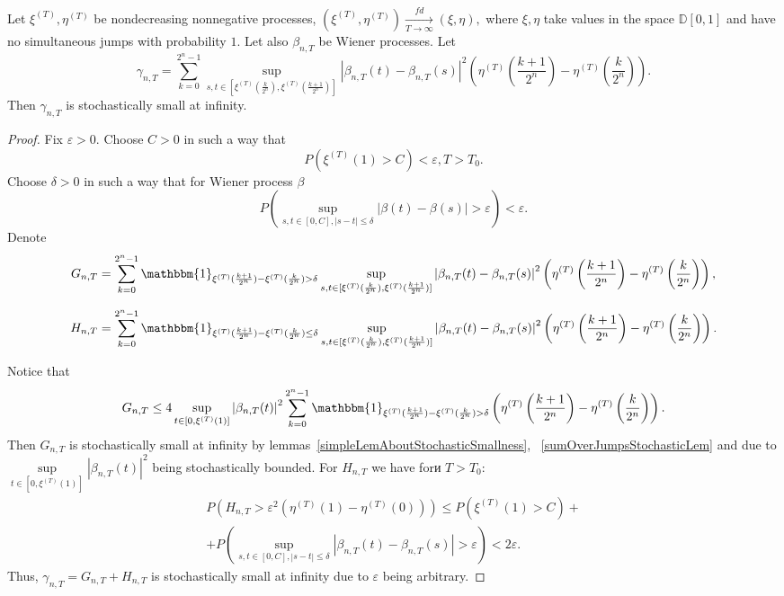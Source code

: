 \documentclass[12pt, a4paper, titlepage]{article}
\begin{document}
 
 \begin{lem}\label{mostSubtleGammaNTLem}
  Let $\xi^{(T)}, \eta^{(T)}$ be nondecreasing nonnegative processes,
  $(\xi^{(T)}, \eta^{(T)})\xrightarrow[T\to\infty]{fd} (\xi, \eta),$
  where $\xi, \eta$ take values in the space $\mathbb{D}[0,1]$
  and have no simultaneous jumps with probability $1$. 
  Let also $\beta_{n, T}$ be Wiener processes. Let
  $$\gamma_{n,T}=\sum\limits_{k=0}^{2^n-1}
  \sup\limits_{s,t \in [\xi^{(T)}(\frac{k}{2^n}), \xi^{(T)}(\frac{k+1}{2^n})]}
  \left|\beta_{n,T}(t)-\beta_{n,T}(s)\right|^2
  \left(\eta^{(T)}\left(\frac{k+1}{2^n}\right)-\eta^{(T)}\left(\frac{k}{2^n}\right)\right).$$
  Then $\gamma_{n,T}$ is stochastically small at infinity.  
 \end{lem}
 \begin{proof}
 Fix $\varepsilon>0$. 
 Choose $C>0$ in such a way that
 $$P\left(\xi^{(T)}(1)>C\right)<\varepsilon, T>T_0.$$
 Choose $\delta>0$ in such a way that for Wiener process $\beta$
 $$P\left(\sup\limits_{s, t \in [0, C], |s-t| \le \delta}|\beta(t)-\beta(s)|>\varepsilon\right) <\varepsilon.$$ 
 Denote
 $$G_{n, T} = \sum\limits_{k=0}^{2^n-1} \mathbbm{1}_{\xi^{(T)}(\frac{k+1}{2^n})-\xi^{(T)}(\frac{k}{2^n})>\delta}
  \sup\limits_{s,t \in [\xi^{(T)}(\frac{k}{2^n}), \xi^{(T)}(\frac{k+1}{2^n})]}  
  \left|\beta_{n,T}(t)-\beta_{n,T}(s)\right|^2
  \left(\eta^{(T)}\left(\frac{k+1}{2^n}\right)-\eta^{(T)}\left(\frac{k}{2^n}\right)\right),$$
 
 $$H_{n, T} = \sum\limits_{k=0}^{2^n-1}
  \mathbbm{1}_{\xi^{(T)}(\frac{k+1}{2^n})-\xi^{(T)}(\frac{k}{2^n}) \le \delta}
  \sup\limits_{s,t \in [\xi^{(T)}(\frac{k}{2^n}), \xi^{(T)}(\frac{k+1}{2^n})]}  
  \left|\beta_{n,T}(t)-\beta_{n,T}(s)\right|^2
  \left(\eta^{(T)}\left(\frac{k+1}{2^n}\right)-\eta^{(T)}\left(\frac{k}{2^n}\right)\right).$$
  
  Notice that 
  $$ G_{n,T} \le 
   4 \sup\limits_{t \in [0, \xi^{(T)}(1)]}
  \left|\beta_{n,T}(t)\right|^2
  \sum\limits_{k=0}^{2^n-1} \mathbbm{1}_{\xi^{(T)}(\frac{k+1}{2^n})-\xi^{(T)}(\frac{k}{2^n})>\delta}
  \left(\eta^{(T)}\left(\frac{k+1}{2^n}\right)-\eta^{(T)}\left(\frac{k}{2^n}\right)\right).
 $$  
 Then $G_{n, T}$ is stochastically small at infinity
 by lemmas~\ref{simpleLemAboutStochasticSmallness},
 ~\ref{sumOverJumpsStochasticLem} and due to
 $\sup\limits_{t \in [0, \xi^{(T)}(1)]}\left|\beta_{n,T}(t)\right|^2$
 being stochastically bounded. 
 For $H_{n, T}$ we have forи $T>T_0$: 
 \begin{multline*}
   P\left(H_{n, T} > \varepsilon^2 \left(\eta^{(T)}(1)-\eta^{(T)}(0)\right)\right)\le 
  P\left(\xi^{(T)}(1)>C\right)+\\+
  P\left(\sup\limits_{s, t \in [0, C], |s-t| \le \delta}|\beta_{n,T}(t)-\beta_{n,T}(s)|>\varepsilon\right) <
  2\varepsilon.
 \end{multline*}
  Thus, $\gamma_{n,T}=G_{n,T}+H_{n,T}$ is stochastically small at infinity
  due to $\varepsilon$ being arbitrary.  
 \end{proof}
 
\end{document}

